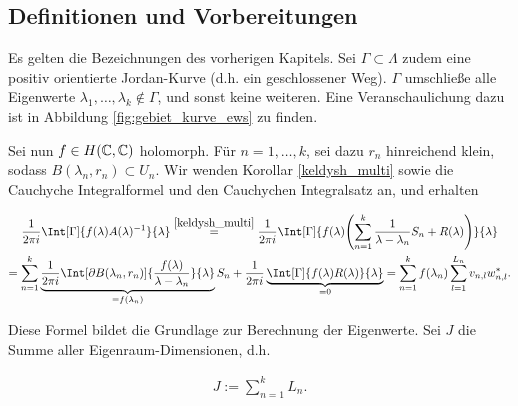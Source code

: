 \subsection*{Definitionen und Vorbereitungen}

Es gelten die Bezeichnungen des vorherigen Kapitels.
Sei $\Gamma \subset \Lambda$ zudem eine positiv orientierte Jordan-Kurve (d.h. ein geschlossener Weg).
$\Gamma$ umschließe alle Eigenwerte $\lambda_1, \dots, \lambda_k \not \in \Gamma$, und sonst keine weiteren.
Eine Veranschaulichung dazu ist in Abbildung \ref{fig:gebiet_kurve_ews} zu finden.



Sei nun $f \in H(\mathbb{C}, \mathbb{C})$ holomorph.
Für $n = 1, \dots, k$, sei dazu $r_n$ hinreichend klein, sodass $B(\lambda_n, r_n) \subset U_n$.
Wir wenden Korollar \ref{keldysh_multi} sowie die Cauchyche Integralformel und den Cauchychen Integralsatz an, und erhalten

\begin{multline} \label{eq:cauchysche_integral_formel_satz}
    \frac{1}{2 \pi i}
    \Int[\Gamma]
    {
        f(\lambda) A(\lambda)^{-1}
    }{\lambda}
    \stackrel
    {
        \ref{keldysh_multi}
    }{=}
    \frac{1}{2 \pi i}
    \Int[\Gamma]
    {
        f(\lambda)
        \pbraces
        {
            \sum_{n=1}^k
                \frac{1}{\lambda - \lambda_n} S_n
                +
                R(\lambda)
        }
    }{\lambda} \\
    =
    \sum_{n=1}^k
        \underbrace
        {
            \frac{1}{2 \pi i}
            \Int[\partial B(\lambda_n, r_n)]
            {
                \frac{f(\lambda)}{\lambda - \lambda_n}
            }{\lambda}
        }_{=f(\lambda_n)}
        S_n
    +
    \frac{1}{2 \pi i}
    \underbrace
    {
        \Int[\Gamma]
        {
            f(\lambda) R(\lambda)
        }{\lambda}
    }_{=0}
    =
    \sum_{n=1}^k
        f(\lambda_n)
        \sum_{l=1}^{L_n}
            v_{n, l} w_{n, l}^\ast.
\end{multline}

Diese Formel bildet die Grundlage zur Berechnung der Eigenwerte.
Sei $J$ die Summe aller Eigenraum-Dimensionen, d.h.

\begin{align*}
    J
    :=
    \sum_{n=1}^k
        L_n.
\end{align*}

\begin{comment}

    Für lineare Eigenwertprobleme würde weiters gelten

    \begin{align*}
        J
        \stackrel{!}{=}
        \sum_{n=1}^k
            \Def(A - I_N \lambda_n)
        =
        \dim
        \bigoplus_{n=1}^k
            \ker (A - I_N \lambda_n)
        \ll
        \dim \C^N
        =
        N.
    \end{align*}

\end{comment}

